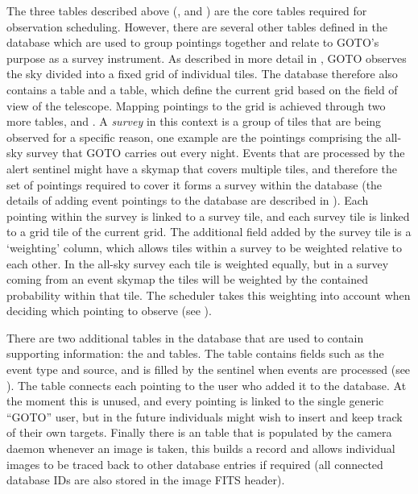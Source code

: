 \begin{colsection}
The three tables described above (,  and ) are the core tables required for observation scheduling. However, there are several other tables defined in the database which are used to group pointings together and relate to GOTO's purpose as a survey instrument. As described in more detail in , GOTO observes the sky divided into a fixed grid of individual tiles. The database therefore also contains a  table and a  table, which define the current grid based on the field of view of the telescope. Mapping pointings to the grid is achieved through two more tables,  and . A \textit{survey} in this context is a group of tiles that are being observed for a specific reason, one example are the pointings comprising the all-sky survey that GOTO carries out every night. Events that are processed by the alert sentinel might have a skymap that covers multiple tiles, and therefore the set of pointings required to cover it forms a survey within the database (the details of adding event pointings to the database are described in ). Each pointing within the survey is linked to a survey tile, and each survey tile is linked to a grid tile of the current grid. The additional field added by the survey tile is a `weighting' column, which allows tiles within a survey to be weighted relative to each other. In the all-sky survey each tile is weighted equally, but in a survey coming from an event skymap the tiles will be weighted by the contained probability within that tile. The scheduler takes this weighting into account when deciding which pointing to observe (see ).

There are two additional tables in the database that are used to contain supporting information: the  and  tables. The  table contains fields such as the event type and source, and is filled by the sentinel when events are processed (see ). The  table connects each pointing to the user who added it to the database. At the moment this is unused, and every pointing is linked to the single generic ``GOTO'' user, but in the future individuals might wish to insert and keep track of their own targets. Finally there is an  table that is populated by the camera daemon whenever an image is taken, this builds a record and allows individual images to be traced back to other database entries if required (all connected database IDs are also stored in the image FITS header).

\end{colsection}

